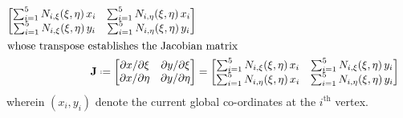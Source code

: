 \begin{subequations}
\begin{align}
\begin{bmatrix}
	\sum\nolimits_{i=1}^5 N_{i,\xi} (\xi,\eta) \, x_i & \sum\nolimits_{i=1}^5 N_{i,\eta} (\xi,\eta) \, x_i \\
	\sum\nolimits_{i=1}^5 N_{i,\xi} (\xi,\eta) \, y_i & \sum\nolimits_{i=1}^5 N_{i,\eta} (\xi,\eta) \, y_i
	\end{bmatrix}
	\label{currentGradients} \\
    \intertext{whose transpose establishes the Jacobian matrix}
    \mathbf{J} \defeq \begin{bmatrix}
    \partial x / \partial\xi & \partial y / \partial\xi \\
    \partial x / \partial\eta & \partial y / \partial\eta
    \end{bmatrix} & = 
    \begin{bmatrix}
    \sum\nolimits_{i=1}^5 N_{i,\xi} (\xi,\eta) \, x_i & \sum\nolimits_{i=1}^5 N_{i,\xi} (\xi,\eta) \, y_i \\
    \sum\nolimits_{i=1}^5 N_{i,\eta} (\xi,\eta) \, x_i & \sum\nolimits_{i=1}^5 N_{i,\eta} (\xi,\eta) \, y_i
    \end{bmatrix}
    \label{JacobianMtx2D}
	\end{align}
\end{subequations}
wherein $(x_i, y_i)$ denote the current global co-ordinates at the $i^{\mathrm{th}}$ vertex.

